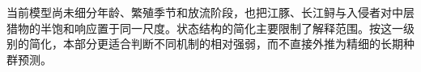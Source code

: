 当前模型尚未细分年龄、繁殖季节和放流阶段，也把江豚、长江鲟与入侵者对中层猎物的半饱和响应置于同一尺度。状态结构的简化主要限制了解释范围。按这一级别的简化，本部分更适合判断不同机制的相对强弱，而不直接外推为精细的长期种群预测。
